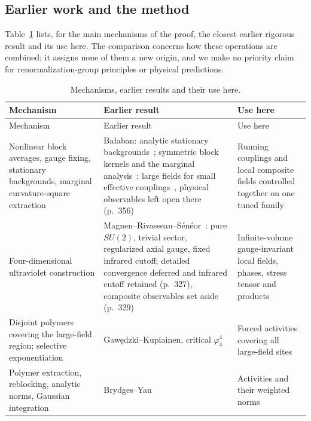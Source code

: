\subsection{Earlier work and the method}\label{sec:intro-earlier}

Table~\ref{tab:earlier-work} lists, for the main mechanisms of the proof, the closest earlier rigorous result and its use here. The comparison concerns how these operations are combined; it assigns none of them a new origin, and we make no priority claim for renormalization-group principles or physical predictions.

\begingroup
\small
\setlength{\tabcolsep}{4pt}
\renewcommand{\arraystretch}{1.12}
\begin{longtable}{@{}p{}p{}p{}@{}}
\caption{Mechanisms, earlier results and their use here.}\label{tab:earlier-work}\\
\toprule
Mechanism & Earlier result & Use here\\
\midrule
\endfirsthead
\toprule
Mechanism & Earlier result & Use here\\
\midrule
\endhead
\bottomrule
\endfoot
Nonlinear block averages, gauge fixing, stationary backgrounds, marginal curvature-square extraction & Ba\l{}aban: analytic stationary backgrounds~\cite[Theorem~1, Proposition~6]{Balaban1985Variational}; symmetric block kernels and the marginal analysis~\cite[pp.~252--254, \S\S4--5]{Balaban1987RG}; large fields for small effective couplings~\cite[Theorem~1, p.~355]{Balaban1989Large}, physical observables left open there (p.~356) & Running couplings and local composite fields controlled together on one tuned family\\[2pt]
Four-dimensional ultraviolet construction & Magnen--Rivasseau--S\'en\'eor~\cite{MagnenRivasseauSeneor1993}: pure $SU(2)$, trivial sector, regularized axial gauge, fixed infrared cutoff; detailed convergence deferred and infrared cutoff retained (p.~327), composite observables set aside (p.~329) & Infinite-volume gauge-invariant local fields, phases, stress tensor and products\\[2pt]
Disjoint polymers covering the large-field region; selective exponentiation & Gaw\k{e}dzki--Kupiainen, critical $\varphi^4_4$~\cite[p.~212, (4.8), pp.~218--221]{GawedzkiKupiainen1985} & Forced activities covering all large-field sites\\[2pt]
Polymer extraction, reblocking, analytic norms, Gaussian integration & Brydges--Yau~\cite[\S\S1--2, pp.~378--384]{BrydgesYau1990} & Activities and their weighted norms\\[2pt]

\end{longtable}
